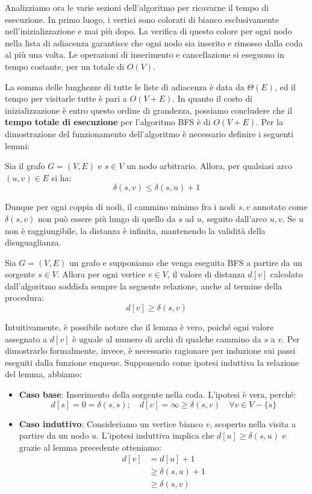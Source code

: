 Analizziamo ora le varie sezioni dell'algoritmo per ricavarne il tempo di esecuzione. In primo luogo, i vertici sono colorati di bianco esclusivamente nell'inizializzazione e mai più dopo. La verifica di questo colore per ogni nodo nella lista di adiacenza garantisce che ogni nodo sia inserito e rimosso dalla coda al più una volta. Le operazioni di inserimento e cancellazione si eseguono in tempo costante, per un totale di $O(V)$.\par 
La somma delle lunghezze di tutte le liste di adiacenza è data da $\Theta(E)$, ed il tempo per visitarle tutte è pari a $O(V+E)$. In quanto il costo di inizializzazione è entro questo ordine di grandezza, possiamo concludere che il \textbf{tempo totale di esecuzione} per l'algoritmo BFS è di $O(V+E)$. Per la dimostrazione del funzionamento dell'algoritmo è necessario definire i seguenti lemmi: \begin{lemma}
	Sia il grafo $G=(V,E)$ e $s\in V$ un nodo arbitrario. Allora, per qualsiasi arco $(u,v)\in E$ si ha: \[\delta(s,v) \leq \delta(s,u)+1\]
\end{lemma}
\noindent Dunque per ogni coppia di nodi, il cammino minimo fra i nodi $s,v$ annotato come $\delta(s,v)$ non può essere più lungo di quello da $s$ ad $u$, seguito dall'arco $u,v$. Se $u$ non è raggiungibile, la distanza è infinita, mantenendo la validità della disuguaglianza. \begin{lemma}
	Sia $G=(V,E)$ un grafo e supponiamo che venga eseguita BFS a partire da un sorgente $s\in V$. Allora per ogni vertice $v\in V$, il valore di distanza $d[v]$ calcolato dall'algoritmo soddisfa sempre la seguente relazione, anche al termine della procedura: \[d[v] \geq \delta(s,v)\]
\end{lemma}
\noindent Intuitivamente, è possibile notare che il lemma è vero, poiché ogni valore assegnato a $d[v]$ è uguale al numero di archi di qualche cammino da $s$ a $v$. Per dimostrarlo formalmente, invece, è necessario ragionare per induzione sui passi eseguiti dalla funzione enqueue. Supponendo come ipotesi induttiva la relazione del lemma, abbiamo: \begin{itemize}
	\item \textbf{Caso base}: Inserimento della sorgente nella coda. L'ipotesi è vera, perché: \[d[s]=0=\delta(s,s);\quad d[v]=\infty\geq \delta(s,v)\quad\forall v\in V - \{s\}\]
	\item \textbf{Caso induttivo}: Consideriamo un vertice bianco $v$, scoperto nella visita a partire da un nodo $u$. L'ipotesi induttiva implica che $d[u]\geq \delta(s,u)$ e grazie al lemma precedente otteniamo: \begin{equation}
		\begin{split}
			d[v] &= d[u]+1\\
			&\geq \delta(s,u)+1\\
			&\geq \delta(s,v)
		\end{split}
	\end{equation}
\end{itemize}
